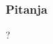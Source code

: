 \documentclass{beamer}
\begin{document}





\begin{frame}
	\frametitle{Pitanja}
	\begin{center}
		\huge{?}
	\end{center}
\end{frame}
\end{document}
